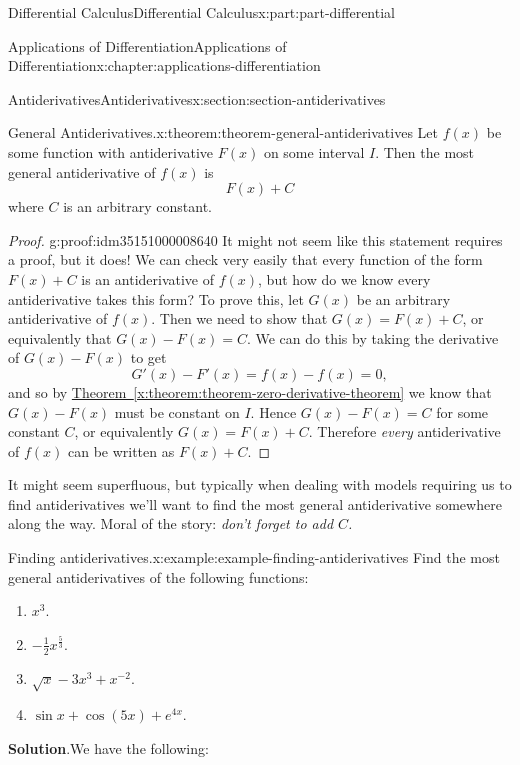 \documentclass[twoside,10pt,]{book}
\newcommand{\blocktitlefont}{\relax}
\newcommand{\xreffont}{\relax}
\numberwithin{equation}{part}
\begin{document}
\begin{partptx}{Differential Calculus}{}{Differential Calculus}{}{}{x:part:part-differential}
\begin{chapterptx}{Applications of Differentiation}{}{Applications of Differentiation}{}{}{x:chapter:applications-differentiation}
\begin{sectionptx}{Antiderivatives}{}{Antiderivatives}{}{}{x:section:section-antiderivatives}
\begin{theorem}{General Antiderivatives.}{}{x:theorem:theorem-general-antiderivatives}%
Let \(f(x)\) be some function with antiderivative \(F(x)\) on some interval \(I\). Then the most general antiderivative of \(f(x)\) is%
\begin{equation*}
F(x) + C
\end{equation*}
where \(C\) is an arbitrary constant.%
\end{theorem}
\begin{proof}{}{g:proof:idm35151000008640}
It might not seem like this statement requires a proof, but it does! We can check very easily that every function of the form \(F(x)+C\) is an antiderivative of \(f(x)\), but how do we know every antiderivative takes this form? To prove this, let \(G(x)\) be an arbitrary antiderivative of \(f(x)\). Then we need to show that \(G(x) = F(x) + C\), or equivalently that \(G(x) - F(x) = C\). We can do this by taking the derivative of \(G(x) - F(x)\) to get%
\begin{equation*}
G'(x) - F'(x) = f(x) - f(x) = 0,
\end{equation*}
and so by \hyperref[x:theorem:theorem-zero-derivative-theorem]{Theorem~{\xreffont\ref{x:theorem:theorem-zero-derivative-theorem}}} we know that \(G(x) - F(x)\) must be constant on \(I\). Hence \(G(x) - F(x) = C\) for some constant \(C\), or equivalently \(G(x) = F(x)+C\). Therefore \emph{every} antiderivative of \(f(x)\) can be written as \(F(x) + C\).%
\end{proof}
It might seem superfluous, but typically when dealing with models requiring us to find antiderivatives we'll want to find the most general antiderivative somewhere along the way. Moral of the story: \emph{don't forget to add \(C\).}%
\begin{example}{Finding antiderivatives.}{x:example:example-finding-antiderivatives}%
Find the most general antiderivatives of the following functions:%
\begin{enumerate}
\item{}\(\displaystyle x^{3}.\)%
\item{}\(\displaystyle -\frac{1}{2}x^{\frac{5}{3}}.\)%
\item{}\(\displaystyle \sqrt{x} - 3x^{3} + x^{-2}.\)%
\item{}\(\displaystyle \sin x + \cos (5x) + e^{4x}.\)%
\end{enumerate}
%
\par\smallskip%
\noindent\textbf{\blocktitlefont Solution}.\hypertarget{g:solution:idm35150999997760}{}\quad{}We have the following:%

\end{example}
\end{sectionptx}
\end{chapterptx}
\end{partptx}
\end{document}
